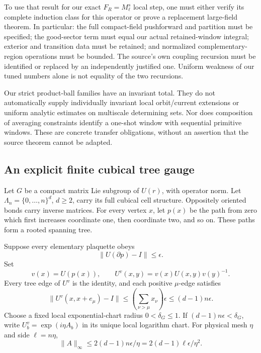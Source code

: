 To use that result for our exact \(F_R=M_\ell^s\) local step,
one must either verify its complete induction class for this
operator or prove a replacement large-field theorem. In particular:
the full compact-field pushforward and partition must be specified;
the good-sector term must equal our actual retained-window
integral; exterior and transition data must be retained; and
normalized complementary-region operations must be bounded.
The source's own coupling recursion must be identified or replaced
by an independently justified one. Uniform weakness of our tuned
numbers alone is not equality of the two recursions.

Our strict product-ball families have an invariant total.
They do not automatically supply individually invariant local
orbit/current extensions or uniform analytic estimates on
multiscale determining sets. Nor does composition of averaging
constraints identify a one-shot window with sequential primitive
windows. These are concrete transfer obligations, without an
assertion that the source theorem cannot be adapted.

\subsection{An explicit finite cubical tree gauge}
\label{fmg-tree}

Let \(G\) be a compact matrix Lie subgroup of \(U(r)\), with
operator norm. Let
\(\Lambda_n=\{0,\ldots,n\}^d\), \(d\ge2\), carry its full cubical
cell structure. Oppositely oriented bonds carry inverse matrices.
For every vertex \(x\), let \(p(x)\) be the path from zero which
first increases coordinate one, then coordinate two, and so on.
These paths form a rooted spanning tree.

\begin{lemma}
\label{fmg-tree-lemma}
Suppose every elementary plaquette obeys
\begin{equation}
                  \|U(\partial p)-I\|\le\epsilon.
 \label{fmg-plaquette-bound}
\end{equation}
Set
\begin{equation}
 v(x)=U(p(x)),\qquad
 U^v(x,y)=v(x)U(x,y)v(y)^{-1}.
 \label{fmg-gauge}
\end{equation}
Every tree edge of \(U^v\) is the identity, and each positive
\(\mu\)-edge satisfies
\begin{equation}
 \|U^v(x,x+e_\mu)-I\|
       \le\left(\sum_{\nu>\mu}x_\nu\right)\epsilon
       \le(d-1)n\epsilon.
 \label{fmg-edge-bound}
\end{equation}
Choose a fixed local exponential-chart radius
\(0<\delta_G\le1\). If \((d-1)n\epsilon<\delta_G\), write
\(U^v_b=\exp(i\eta A_b)\) in its unique local logarithm chart.
For physical mesh \(\eta\) and side \(\ell=n\eta\),
\begin{equation}
 \|A\|_\infty
       \le 2(d-1)n\epsilon/\eta
       =2(d-1)\ell\epsilon/\eta^2 .
 \label{fmg-physical-bound}
\end{equation}
\end{lemma}

